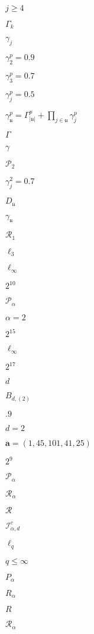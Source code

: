 \documentclass{article}
\begin{document}
$j \geq 4$
\pagebreak

$\Gamma_k$
\pagebreak

$\gamma_j$
\pagebreak

$\gamma_2^p = 0.9$
\pagebreak

$\gamma_3^p =
  0.7$
\pagebreak

$\gamma_j^p = 0.5$
\pagebreak

$ \gamma_{\mathfrak u}^p = \Gamma_{|\mathfrak u|}^p + \prod_{j \in \mathfrak u} \gamma^p_j $
\pagebreak

$ \Gamma $
\pagebreak

$ \gamma $
\pagebreak

$\mathcal P_2$
\pagebreak

$\gamma_j^2 = 0.7$
\pagebreak

$D_{\mathfrak u}$
\pagebreak

$\gamma_{\mathfrak u}$
\pagebreak

$\mathcal R_1$
\pagebreak

$\ell_3$
\pagebreak

$\ell_\infty$
\pagebreak

$2^{10}$
\pagebreak

$\mathcal P_\alpha$
\pagebreak

$\alpha=2$
\pagebreak

$2^{15}$
\pagebreak

$\ell_{\infty}$
\pagebreak

$2^{17}$
\pagebreak

$d$
\pagebreak

$B_{d,(2)}$
\pagebreak

$.9$
\pagebreak

$d=2$
\pagebreak

$\boldsymbol a=(1,45,101,41,25)$
\pagebreak

$2^9$
\pagebreak

$\mathcal
                        P_\alpha$
\pagebreak

$\mathcal
                        R_\alpha$
\pagebreak

$\mathcal
                        R$
\pagebreak

$\mathcal I^{c}_{\alpha, d}$
\pagebreak

$ \ell_q $
\pagebreak

$ q \leq \infty $
\pagebreak

$ P_\alpha $
\pagebreak

$ R_\alpha $
\pagebreak

$ R $
\pagebreak

$\mathcal R_\alpha$
\pagebreak
\end{document}
